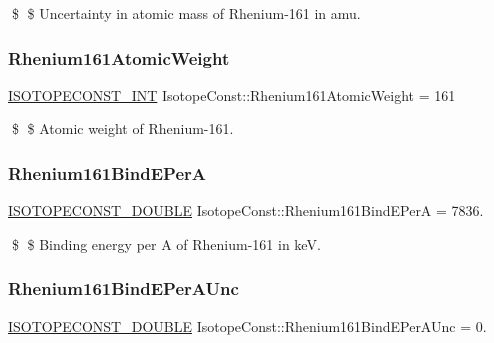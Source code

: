 \$ \$ Uncertainty in atomic mass of Rhenium-\/161 in amu. \mbox{\label{group___isotope_const-_rhenium-_re161_ga97106bac4744dde6efa18712e2ea7aef}} 
\subsubsection{\texorpdfstring{Rhenium161\+Atomic\+Weight}{Rhenium161AtomicWeight}}
{\footnotesize\ttfamily \mbox{\hyperlink{group___isotope_const-_macros_ga5f18360b3e99483a35c32d789e62621c}{I\+S\+O\+T\+O\+P\+E\+C\+O\+N\+S\+T\+\_\+\+I\+NT}} Isotope\+Const\+::\+Rhenium161\+Atomic\+Weight = 161}

\$ \$ Atomic weight of Rhenium-\/161. \mbox{\label{group___isotope_const-_rhenium-_re161_ga41ba41c134696fa6b33f1701b4af70d7}} 
\subsubsection{\texorpdfstring{Rhenium161\+Bind\+E\+PerA}{Rhenium161BindEPerA}}
{\footnotesize\ttfamily \mbox{\hyperlink{group___isotope_const-_macros_ga8f45a7272ce02c0b4c65c44636ed719a}{I\+S\+O\+T\+O\+P\+E\+C\+O\+N\+S\+T\+\_\+\+D\+O\+U\+B\+LE}} Isotope\+Const\+::\+Rhenium161\+Bind\+E\+PerA = 7836.}

\$ \$ Binding energy per A of Rhenium-\/161 in keV. \mbox{\label{group___isotope_const-_rhenium-_re161_gab3fb4bfe7a0f228a0c76dd978500ee93}} 
\subsubsection{\texorpdfstring{Rhenium161\+Bind\+E\+Per\+A\+Unc}{Rhenium161BindEPerAUnc}}
{\footnotesize\ttfamily \mbox{\hyperlink{group___isotope_const-_macros_ga8f45a7272ce02c0b4c65c44636ed719a}{I\+S\+O\+T\+O\+P\+E\+C\+O\+N\+S\+T\+\_\+\+D\+O\+U\+B\+LE}} Isotope\+Const\+::\+Rhenium161\+Bind\+E\+Per\+A\+Unc = 0.}

